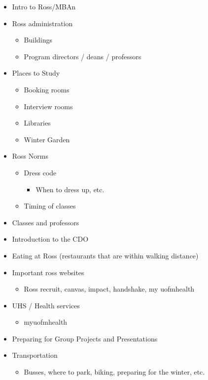 \documentclass[
]{book}
\providecommand{\tightlist}{%
  \setlength{\itemsep}{0pt}\setlength{\parskip}{0pt}}
\begin{document}
\begin{itemize}
\tightlist
\item
  Intro to Ross/MBAn
\item
  Ross administration

  \begin{itemize}
  \tightlist
  \item
    Buildings
  \item
    Program directors / deans / professors
  \end{itemize}
\item
  Places to Study

  \begin{itemize}
  \tightlist
  \item
    Booking rooms
  \item
    Interview rooms
  \item
    Libraries
  \item
    Winter Garden
  \end{itemize}
\item
  Ross Norms

  \begin{itemize}
  \tightlist
  \item
    Dress code

    \begin{itemize}
    \tightlist
    \item
      When to dress up, etc.
    \end{itemize}
  \item
    Timing of classes
  \end{itemize}
\item
  Classes and professors
\item
  Introduction to the CDO
\item
  Eating at Ross (restaurants that are within walking distance)
\item
  Important ross websites

  \begin{itemize}
  \tightlist
  \item
    Ross recruit, canvas, impact, handshake, my uofmhealth
  \end{itemize}
\item
  UHS / Health services

  \begin{itemize}
  \tightlist
  \item
    myuofmhealth
  \end{itemize}
\item
  Preparing for Group Projects and Presentations
\item
  Transportation

  \begin{itemize}
  \tightlist
  \item
    Busses, where to park, biking, preparing for the winter, etc.
  \end{itemize}
\end{itemize}
\end{document}
